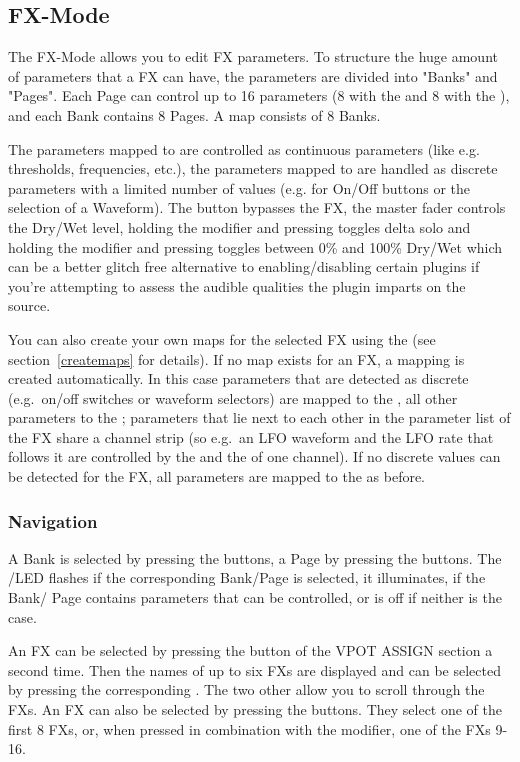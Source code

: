 \subsection{FX-Mode}\label{plugmode} 

The FX-Mode allows you to edit FX parameters. To structure the huge
amount of parameters that a FX can have, the parameters are divided
into "Banks" and "Pages". Each Page can control up to 16 parameters (8
with the \faders and 8 with the \vpots), and each Bank contains 8
Pages. A map consists of 8 Banks.

The parameters mapped to \faders are controlled as continuous
parameters (like e.g. thresholds, frequencies, etc.), the parameters
mapped to \vpots are handled as discrete parameters with a limited
number of values (e.g. for On/Off buttons or the selection of a
Waveform). The \flip button bypasses the FX, the master fader controls
the Dry/Wet level, holding the \alt modifier and pressing \flip
toggles delta solo and holding the \shift modifier and pressing \flip
toggles between 0\% and 100\% Dry/Wet which can be a better glitch free
alternative to enabling/disabling certain plugins if you're attempting
to assess the audible qualities the plugin imparts on the source.


You can also create your own maps for the selected FX using the
\mapeditor (see section~\ref{createmaps} for details). If no map exists
for an FX, a mapping is created automatically. In this case parameters
that are detected as discrete (e.g.\ on/off switches or waveform
selectors) are mapped to the \vpots, all other parameters to the
\faders; parameters that lie next to each other in the parameter
list of the FX share a channel strip (so e.g.\ an LFO waveform and
the LFO rate that follows it are controlled by the \vpot and the
\fader of one channel). If no discrete values can be detected for
the FX, all parameters are mapped to the \faders as before.


\subsubsection{Navigation}

A Bank is selected by pressing the \solo buttons, a Page by pressing
the \mute buttons. The \solo/\mute LED flashes if the corresponding
Bank/Page is selected, it illuminates, if the Bank/ Page contains parameters
that can be controlled, or is off if neither is the case.

An FX can be selected by pressing the \plug button of the VPOT ASSIGN
section a second time. Then the names of up to six FXs are displayed
and can be selected by pressing the corresponding \vpot. The two other
\vpots allow you to scroll through the FXs. An FX can also be selected
by pressing the \select buttons. They select one of the first 8 FXs,
or, when pressed in combination with the \shift modifier, one of the
FXs 9-16.



